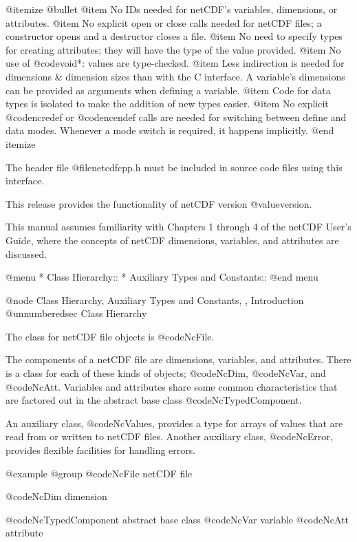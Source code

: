 @itemize @bullet
@item
No IDs needed for netCDF's variables, dimensions, or attributes.
@item
No explicit open or close calls needed for netCDF files; a constructor
opens and a destructor closes a file.
@item
No need to specify types for creating attributes; they will have the
type of the value provided.
@item
No use of @code{void*}: values are type-checked.
@item
Less indirection is needed for dimensions & dimension sizes than with
the C interface.  A variable's dimensions can be provided as arguments 
when defining a variable.
@item
Code for data types is isolated to make the addition of new
types easier.
@item
No explicit @code{ncredef} or @code{ncendef} calls are needed for
switching between define and data modes.  Whenever a mode switch is
required, it happens implicitly.
@end itemize

The header file @file{netcdfcpp.h} must be included in source code files
using this interface.

This release provides the functionality of netCDF version
@value{version}.

This manual assumes familiarity with Chapters 1 through 4 of the netCDF
User's Guide, where the concepts of netCDF dimensions, variables, and
attributes are discussed.

@menu
* Class Hierarchy::             
* Auxiliary Types and Constants::  
@end menu

@node Class Hierarchy, Auxiliary Types and Constants,  , Introduction
@unnumberedsec Class Hierarchy

The class for netCDF file objects is @code{NcFile}.

The components of a netCDF file are dimensions, variables, and
attributes.  There is a class for each of these kinds of objects;
@code{NcDim}, @code{NcVar}, and @code{NcAtt}.  Variables and attributes
share some common characteristics that are factored out in the
abstract base class @code{NcTypedComponent}.

An auxiliary class, @code{NcValues}, provides a type for arrays of values
that are read from or written to netCDF files.  Another auxiliary class,
@code{NcError}, provides flexible facilities for handling errors.

@example
@group
@code{NcFile}                     netCDF file

@code{NcDim}                      dimension

@code{NcTypedComponent}           abstract base class
        @code{NcVar}                variable
        @code{NcAtt}                attribute

